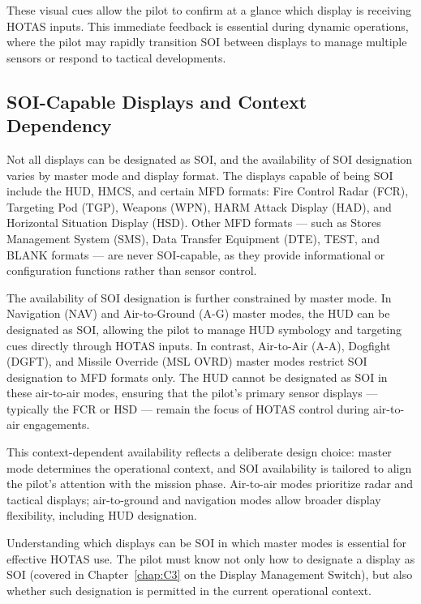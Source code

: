 \documentclass[11pt, a4paper, twoside]{report}
\begin{document}
These visual cues allow the pilot to confirm at a glance which display is receiving HOTAS inputs. This immediate feedback is essential during dynamic operations, where the pilot may rapidly transition SOI between displays to manage multiple sensors or respond to tactical developments.


\subsection{SOI-Capable Displays and Context Dependency}
\label{sec:C2-S1-S3}

Not all displays can be designated as SOI, and the availability of SOI designation varies by master mode and display format. The displays capable of being SOI include the HUD, HMCS, and certain MFD formats: Fire Control Radar (FCR), Targeting Pod (TGP), Weapons (WPN), HARM Attack Display (HAD), and Horizontal Situation Display (HSD). Other MFD formats — such as Stores Management System (SMS), Data Transfer Equipment (DTE), TEST, and BLANK formats — are never SOI-capable, as they provide informational or configuration functions rather than sensor control.

The availability of SOI designation is further constrained by master mode. In Navigation (NAV) and Air-to-Ground (A-G) master modes, the HUD can be designated as SOI, allowing the pilot to manage HUD symbology and targeting cues directly through HOTAS inputs. In contrast, Air-to-Air (A-A), Dogfight (DGFT), and Missile Override (MSL OVRD) master modes restrict SOI designation to MFD formats only. The HUD cannot be designated as SOI in these air-to-air modes, ensuring that the pilot's primary sensor displays — typically the FCR or HSD — remain the focus of HOTAS control during air-to-air engagements.

This context-dependent availability reflects a deliberate design choice: master mode determines the operational context, and SOI availability is tailored to align the pilot's attention with the mission phase. Air-to-air modes prioritize radar and tactical displays; air-to-ground and navigation modes allow broader display flexibility, including HUD designation.

Understanding which displays can be SOI in which master modes is essential for effective HOTAS use. The pilot must know not only how to designate a display as SOI (covered in Chapter~\ref{chap:C3} on the Display Management Switch), but also whether such designation is permitted in the current operational context.
\end{document}
